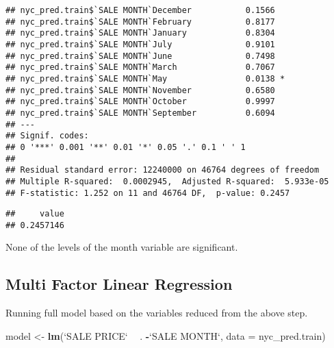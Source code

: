 \documentclass[
  a3paper,
]{article}
\newenvironment{Shaded}{\begin{snugshade}}{\end{snugshade}}
\newcommand{\DataTypeTok}[1]{\textcolor[rgb]{0.13,0.29,0.53}{#1}}
\newcommand{\DecValTok}[1]{\textcolor[rgb]{0.00,0.00,0.81}{#1}}
\newcommand{\KeywordTok}[1]{\textcolor[rgb]{0.13,0.29,0.53}{\textbf{#1}}}
\newcommand{\NormalTok}[1]{#1}
\newcommand{\OperatorTok}[1]{\textcolor[rgb]{0.81,0.36,0.00}{\textbf{#1}}}
\newcommand{\OtherTok}[1]{\textcolor[rgb]{0.56,0.35,0.01}{#1}}
\newcommand{\StringTok}[1]{\textcolor[rgb]{0.31,0.60,0.02}{#1}}
\begin{document}
\begin{verbatim}
## nyc_pred.train$`SALE MONTH`December           0.1566    
## nyc_pred.train$`SALE MONTH`February           0.8177    
## nyc_pred.train$`SALE MONTH`January            0.8304    
## nyc_pred.train$`SALE MONTH`July               0.9101    
## nyc_pred.train$`SALE MONTH`June               0.7498    
## nyc_pred.train$`SALE MONTH`March              0.7067    
## nyc_pred.train$`SALE MONTH`May                0.0138 *  
## nyc_pred.train$`SALE MONTH`November           0.6580    
## nyc_pred.train$`SALE MONTH`October            0.9997    
## nyc_pred.train$`SALE MONTH`September          0.6094    
## ---
## Signif. codes:  
## 0 '***' 0.001 '**' 0.01 '*' 0.05 '.' 0.1 ' ' 1
## 
## Residual standard error: 12240000 on 46764 degrees of freedom
## Multiple R-squared:  0.0002945,  Adjusted R-squared:  5.933e-05 
## F-statistic: 1.252 on 11 and 46764 DF,  p-value: 0.2457
\end{verbatim}

\begin{Shaded}
\end{Shaded}

\begin{verbatim}
##     value 
## 0.2457146
\end{verbatim}

None of the levels of the month variable are significant.

\hypertarget{multi-factor-linear-regression}{%
\subsection{\texorpdfstring{\textbf{Multi Factor Linear
Regression}}{Multi Factor Linear Regression}}\label{multi-factor-linear-regression}}

Running full model based on the variables reduced from the above step.

\begin{Shaded}
\begin{Highlighting}[]
\NormalTok{model <-}\StringTok{ }\KeywordTok{lm}\NormalTok{(}\StringTok{`}\DataTypeTok{SALE PRICE}\StringTok{`} \OperatorTok{~}\StringTok{ }\NormalTok{.  }\OperatorTok{-}\StringTok{`}\DataTypeTok{SALE MONTH}\StringTok{`}\NormalTok{, }\DataTypeTok{data =}\NormalTok{ nyc_pred.train)}
\end{Highlighting}
\end{Shaded}
\end{document}
